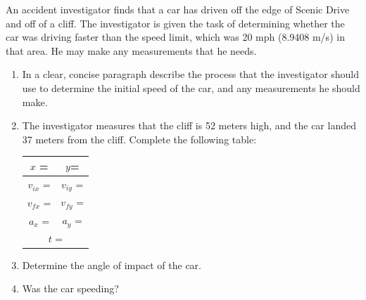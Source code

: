 \documentclass[10pt]{examdesign}
\begin{document}
\begin{shortanswer}[title={Free Response}]
\begin{question}
	An accident investigator finds that a car has driven off the edge of Scenic Drive and off of a cliff.  The investigator is given the task of determining whether the car was driving faster than the speed limit, which was 20 mph (8.9408 m/s) in that area.  He may make any measurements that he needs.  
	\begin{enumerate}
		\item In a clear, concise paragraph describe the process that the investigator should use to determine the initial speed of the car, and any measurements he should make.  
		\vspace{2in}
		\item{The investigator measures that the cliff is 52 meters high, and the car landed 37 meters from the cliff.  Complete the following table:}
		
		\begin{center}
			\begin{tabular} {| c | c | }
				\hline
				$x$ = \hspace{0.4in}    & $y $= \hspace{0.4in} \\
				\hline
				$v_{ix}$  = \hspace{0.4in}  &$v_{iy}$  = \hspace{0.4in} \\
				\hline
				$v_{fx}$  = \hspace{0.4in}  &$v_{fy}$  = \hspace{0.4in} \\
				\hline
				$a_{x}$  = \hspace{0.4in}  &$a_{y}$  = \hspace{0.4in} \\
				\hline 
				\multicolumn{2}{|c|}{	$t$  = \hspace{0.4in} }  \\
				\hline
			\end{tabular} 
		\end{center}
	\item{Determine the angle of impact of the car.}
	\vspace{1in}
	\item{Was the car speeding?}
		
	\end{enumerate}
	\end{question}

	\end{shortanswer}
\end{document}
